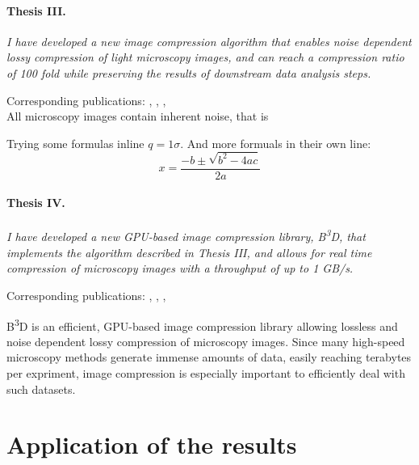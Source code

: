 \documentclass{booklet_style}
\def\b3d{B\textsuperscript{3}D}
\begin{document}
\paragraph{Thesis III.} \textit{I have  developed a new image compression algorithm that enables noise dependent lossy compression of light microscopy images, and can reach a compression ratio of 100 fold while preserving the results of downstream data analysis steps.}

Corresponding publications: \cite{balazs_real-time_2017}, \cite{balazs_gpu-based_2016}, \cite{balazs_gpu-based_2016-1}, \cite{balazs_gpu-based_2017}\\[1ex]
\indent
All microscopy images contain inherent noise, that is 

Trying some formulas inline $q=1\sigma$. And more formuals in their own line:
\begin{equation}
    x = \frac{-b \pm \sqrt{b^2 - 4ac}}{2a}
\end{equation}

\paragraph{Thesis IV.} \textit{I have  developed a new GPU-based image compression library, \b3d, that implements the algorithm described in Thesis III, and allows for real time compression of microscopy images with a throughput of up to 1 GB/s.}

Corresponding publications: \cite{balazs_real-time_2017}, \cite{balazs_gpu-based_2016}, \cite{balazs_gpu-based_2016-1}, \cite{balazs_gpu-based_2017}

\b3d is an efficient, GPU-based image compression library allowing lossless and noise dependent lossy compression of microscopy images. Since many high-speed microscopy methods generate immense amounts of data, easily reaching terabytes per expriment, image compression is especially important to efficiently deal with such datasets.


\section{Application of the results}

%
%
\printbibliography[category=journal, title={The Author's Journal Publications}]

\printbibliography[category=conference, title={The Author's Conference Presentations}]

\newrefcontext
\printbibliography[notcategory=journal,notcategory=conference, resetnumbers=true, title={References}]

\end{document}

